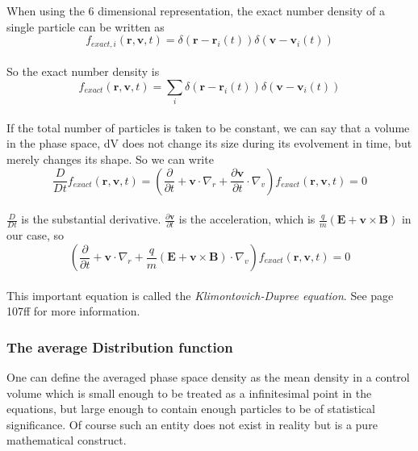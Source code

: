 \documentclass[a4paper,11pt]{thesis}
\begin{document}
When using the 6 dimensional representation, the exact number density of a single particle can be written as\\

\begin{equation}\label{exact_number_density_one_particle}
    f_{exact,i}(\mathbf{r,v},t)=\delta(\mathbf{r}-\mathbf{r}_i(t))\delta(\mathbf{v}-\mathbf{v}_i(t))
\end{equation}\\

So the exact number density is\\

\begin{equation}\label{exact_number_density}
f_{exact}(\mathbf{r,v},t)=\sum_i
\delta(\mathbf{r}-\mathbf{r}_i(t))\delta(\mathbf{v}-\mathbf{v}_i(t))
\end{equation}\\

If the total number of particles is taken to be constant, we can say that a volume in the phase space,
 dV does not change its size during its evolvement in time, but merely changes its shape. So we can write\\

\begin{equation}\label{erhaltung_exact_number_density}
\frac{D}{Dt}f_{exact}(\mathbf{r,v},t)=\left(
\frac{\partial}{\partial t} + \mathbf{v}\cdot
\nabla_r+\frac{\partial \mathbf{v}}{\partial t}\cdot\nabla_v \right)
f_{exact}(\mathbf{r,v},t)=0
\end{equation}\\

$\frac{D}{Dt}$ is the substantial derivative. $\frac{\partial
\mathbf{v}}{\partial t}$ is the acceleration, which is
 $\frac{q}{m}(\mathbf{E}+\mathbf{v}\times \mathbf{B})$ in our case, so\\

\begin{equation}\label{Klimontovich-Dupree}
\left( \frac{\partial}{\partial t} + \mathbf{v}\cdot
\nabla_r+\frac{q}{m}(\mathbf{E}+\mathbf{v}\times
\mathbf{B})\cdot\nabla_v \right) f_{exact}(\mathbf{r,v},t)=0
\end{equation}\\

This important equation is called the \emph{Klimontovich-Dupree
equation}. See \cite{baumjohann1} page 107ff for more information.

\subsubsection{The average Distribution function}
One can define the averaged phase space density as the mean density in a control volume which is small enough to be treated as a infinitesimal point in the equations, but large enough to contain enough particles to be of statistical significance. Of course such an entity does not exist in reality but is a pure mathematical construct.
\end{document}
